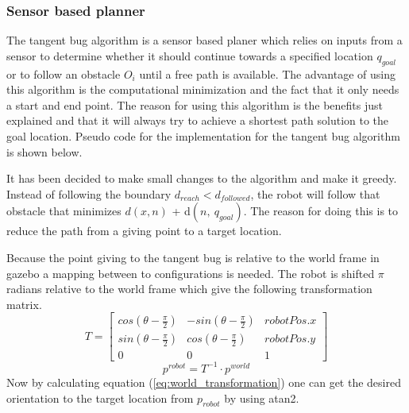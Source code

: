 \documentclass[../Head/Main.tex]{subfiles}
\begin{document}
\subsubsection{Sensor based planner}
The tangent bug algorithm is a sensor based planer which relies on inputs from a sensor to determine whether it should continue towards a  specified location $q_{goal}$ or to follow an obstacle $O_i$ until a free path is available. The advantage of using this algorithm is the computational minimization and the fact that it only needs a start and end point. The reason for using this algorithm is the benefits just explained and that it will always try to achieve a shortest path solution to the goal location. Pseudo code for the implementation for the tangent bug algorithm is shown below.        

It has been decided to make small changes to the algorithm and make it greedy. Instead of following the boundary $d_{reach} < d_{followed}$, the robot will follow that obstacle that minimizes ${d(x,n)}$ + d$\left(n,~q_{goal}\right)$. The reason for doing this is to reduce the path from a giving point to a target location. \par
Because the point giving to the tangent bug is relative to the world frame in gazebo a mapping between to configurations is needed. The robot is shifted $\pi$ radians relative to the world frame which give the following transformation matrix.
\begin{equation}
	T = \begin{bmatrix} 
	   cos(\theta-\frac{\pi}{2}) &  -sin(\theta-\frac{\pi}{2}) & robotPos.x \\ 
	    sin(\theta-\frac{\pi}{2}) &  cos(\theta-\frac{\pi}{2}) & robotPos.y \\
	    0 & 0 & 1					
	\end{bmatrix}
\end{equation}
\begin{equation}\label{eq:world_transformation}
	p^{robot} = T^{-1} \cdot {p^{world}}
\end{equation}	
Now by calculating equation (\ref{eq:world_transformation}) one can get the desired orientation to the target location from $p_{robot}$ by using atan2.
\end{document}
